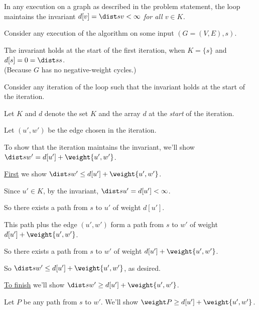 \begin{lemma}\label{lemma: dijkstra invariant}
  In any execution on a graph as described in the problem statement,
  the loop maintains the invariant
  \emph{$d[v] = \dist s  v < \infty$ for all $v\in K$.}
\end{lemma}

\begin{longFormProof}

  \step Consider any execution of the algorithm on some input $(G=(V,E), s)$.

  \step The invariant holds at the start of the first iteration,
  when $K=\{s\}$ and $d[s] = 0 = \dist s s$.
  \\ (Because $G$ has no negative-weight cycles.)

  \begin{block}\label{loop inv}
    
    \step Consider any iteration of the loop such that the invariant holds at the start of the iteration.

    \step Let $K$ and $d$ denote the set $K$ and the array $d$ at the \emph{start} of the iteration.
    
    \step Let $(u',w')$ be the edge chosen in the iteration.
    
    \step To show that the iteration maintains the invariant,
    we'll show $\dist s {w'} = d[u'] + \weight {u', w'}$.

    \smallskip

    \step \underline{First} we show $\dist s {w'} \le d[u'] + \weight {u', w'}$.
    
    \step Since $u'\in K$, by the invariant, $\dist s {u'} = d[u'] < \infty$.

    \step So there exists a path from $s$ to $u'$ of weight $d[u']$.

    \step This path plus the edge $(u', w')$ form a path from $s$ to $w'$ of weight $d[u'] + \weight {u', w'}$.

    \step So there exists a path from $s$ to $w'$ of weight $d[u'] + \weight {u', w'}$.

    \step\label{lt} So $\dist s {w'} \le d[u'] + \weight {u', w'}$, as desired.

    \smallskip
    
    \step \underline{To finish} we'll show $\dist s {w'} \ge d[u'] + \weight {u', w'}$.
    
    \begin{block}\label{P}

      \step Let $P$ be any path from $s$ to $w'$.  We'll show $\weight P \ge d[u'] + \weight {u', w'}$.


\end{block}
\end{block}
\end{longFormProof}
